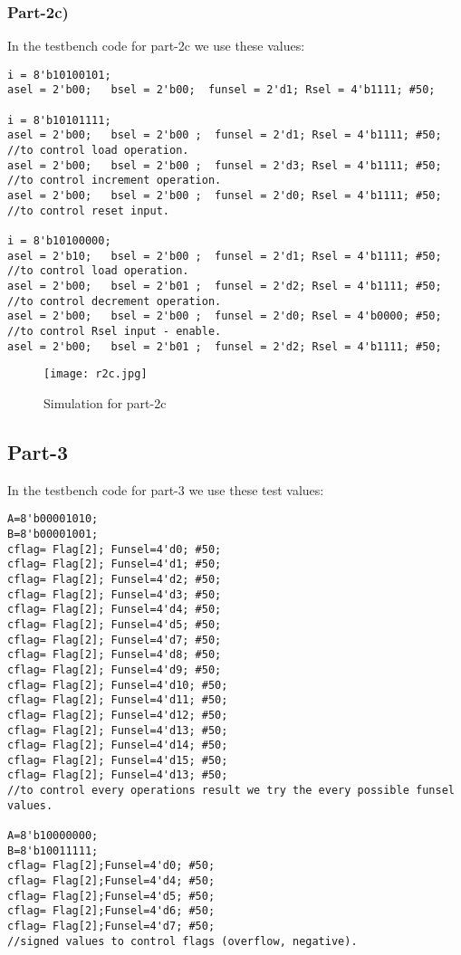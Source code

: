 \documentclass[12pt]{article}
\begin{document}
\subsubsection{Part-2c)}

In the testbench code for part-2c we use these values:

\begin{lstlisting}
i = 8'b10100101;
asel = 2'b00;   bsel = 2'b00;  funsel = 2'd1; Rsel = 4'b1111; #50;

i = 8'b10101111;
asel = 2'b00;   bsel = 2'b00 ;  funsel = 2'd1; Rsel = 4'b1111; #50;
//to control load operation.
asel = 2'b00;   bsel = 2'b00 ;  funsel = 2'd3; Rsel = 4'b1111; #50;
//to control increment operation.
asel = 2'b00;   bsel = 2'b00 ;  funsel = 2'd0; Rsel = 4'b1111; #50;
//to control reset input.

i = 8'b10100000;
asel = 2'b10;   bsel = 2'b00 ;  funsel = 2'd1; Rsel = 4'b1111; #50;
//to control load operation.
asel = 2'b00;   bsel = 2'b01 ;  funsel = 2'd2; Rsel = 4'b1111; #50;
//to control decrement operation.
asel = 2'b00;   bsel = 2'b00 ;  funsel = 2'd0; Rsel = 4'b0000; #50;
//to control Rsel input - enable.
asel = 2'b00;   bsel = 2'b01 ;  funsel = 2'd2; Rsel = 4'b1111; #50;
\end{lstlisting}

\begin{figure}[H]
    \centering
    \texttt{[image: r2c.jpg]}
    \caption{Simulation for part-2c}
    \label{fig:result2c}
\end{figure}


\clearpage

 \subsection{Part-3}

In the testbench code for part-3 we use these test values:

\begin{lstlisting}
A=8'b00001010;
B=8'b00001001;
cflag= Flag[2]; Funsel=4'd0; #50;
cflag= Flag[2]; Funsel=4'd1; #50;
cflag= Flag[2]; Funsel=4'd2; #50;
cflag= Flag[2]; Funsel=4'd3; #50;
cflag= Flag[2]; Funsel=4'd4; #50;
cflag= Flag[2]; Funsel=4'd5; #50;
cflag= Flag[2]; Funsel=4'd7; #50;
cflag= Flag[2]; Funsel=4'd8; #50;
cflag= Flag[2]; Funsel=4'd9; #50;
cflag= Flag[2]; Funsel=4'd10; #50;
cflag= Flag[2]; Funsel=4'd11; #50;
cflag= Flag[2]; Funsel=4'd12; #50;
cflag= Flag[2]; Funsel=4'd13; #50;
cflag= Flag[2]; Funsel=4'd14; #50;
cflag= Flag[2]; Funsel=4'd15; #50;
cflag= Flag[2]; Funsel=4'd13; #50;
//to control every operations result we try the every possible funsel values. 

A=8'b10000000;
B=8'b10011111;
cflag= Flag[2];Funsel=4'd0; #50;
cflag= Flag[2];Funsel=4'd4; #50;
cflag= Flag[2];Funsel=4'd5; #50;
cflag= Flag[2];Funsel=4'd6; #50;
cflag= Flag[2];Funsel=4'd7; #50;
//signed values to control flags (overflow, negative).
\end{lstlisting}
\end{document}

